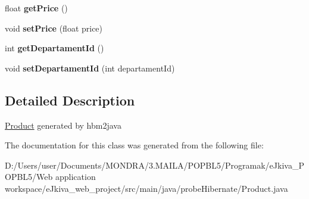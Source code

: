 \begin{DoxyCompactItemize}
float {\bfseries get\+Price} ()
\item 
\mbox{\label{classprobe_hibernate_1_1_product_aa1eb497b9b0633bbf08b2a26818a09e3}} 
void {\bfseries set\+Price} (float price)
\item 
\mbox{\label{classprobe_hibernate_1_1_product_a09eaced16b07ec2e55f2e4b057d2028a}} 
int {\bfseries get\+Departament\+Id} ()
\item 
\mbox{\label{classprobe_hibernate_1_1_product_afb4bb927d2018dc2115cad882b6fc131}} 
void {\bfseries set\+Departament\+Id} (int departament\+Id)
\end{DoxyCompactItemize}


\subsection{Detailed Description}
\mbox{\hyperlink{classprobe_hibernate_1_1_product}{Product}} generated by hbm2java 

The documentation for this class was generated from the following file\+:\begin{DoxyCompactItemize}
\item 
D\+:/\+Users/user/\+Documents/\+M\+O\+N\+D\+R\+A/3.\+M\+A\+I\+L\+A/\+P\+O\+P\+B\+L5/\+Programak/e\+Jkiva\+\_\+\+P\+O\+P\+B\+L5/\+Web application workspace/e\+Jkiva\+\_\+web\+\_\+project/src/main/java/probe\+Hibernate/Product.\+java\end{DoxyCompactItemize}
